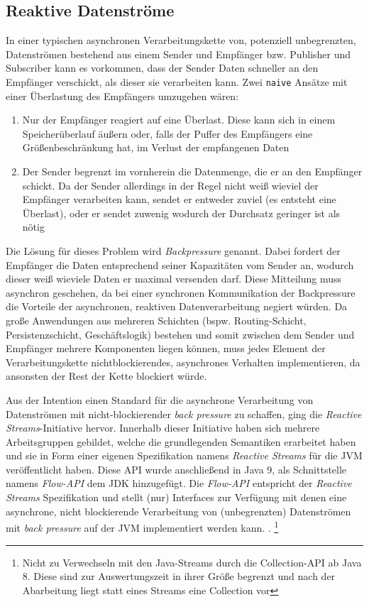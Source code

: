 \subsection{Reaktive Datenströme}
\label{section:reaktive_datenströme}
In einer typischen asynchronen Verarbeitungskette von, potenziell unbegrenzten, Datenströmen
bestehend aus einem Sender und Empfänger bzw. Publisher und Subscriber kann es vorkommen,
dass der Sender Daten schneller an den Empfänger verschickt, als dieser sie verarbeiten kann.
Zwei \verb|naive| Ansätze mit einer Überlastung des Empfängers umzugehen wären:
\begin{enumerate}
  \item Nur der Empfänger reagiert auf eine Überlast. Diese kann sich in einem Speicherüberlauf äußern oder, falls der Puffer des Empfängers eine Größenbeschränkung
        hat, im Verlust der empfangenen Daten
  \item Der Sender begrenzt im vornherein die Datenmenge, die er an den Empfänger schickt. Da der Sender allerdings in der Regel nicht weiß wieviel der Empfänger
        verarbeiten kann, sendet er entweder zuviel (es entsteht eine Überlast), oder er sendet zuwenig wodurch der Durchsatz geringer ist als nötig \parencite{JavaSpektrum2015}
\end{enumerate}
Die Lösung für dieses Problem wird \textit{Backpressure} genannt.
Dabei fordert der Empfänger die Daten entsprechend seiner Kapazitäten vom Sender an, wodurch dieser weiß wieviele Daten er maximal versenden darf.
Diese Mitteilung muss asynchron geschehen, da bei einer synchronen Kommunikation der Backpressure die Vorteile der asynchronen, reaktiven Datenverarbeitung
negiert würden.
Da große Anwendungen aus mehreren Schichten (bspw. Routing-Schicht, Persistenzschicht, Geschäftslogik) bestehen und somit zwischen
dem Sender und Empfänger mehrere Komponenten liegen können, muss jedes
Element der Verarbeitungskette nichtblockierendes, asynchrones Verhalten implementieren, da ansonsten der Rest der Kette blockiert würde.

Aus der Intention einen Standard für die asynchrone Verarbeitung von Datenströmen mit nicht-blockierender \textit{back pressure}
zu schaffen, ging die \textit{Reactive Streams}-Initiative hervor.
Innerhalb dieser Initiative haben sich mehrere Arbeitsgruppen gebildet, welche die grundlegenden Semantiken erarbeitet haben und
sie in Form einer eigenen Spezifikation namens \textit{Reactive Streams} für die JVM veröffentlicht haben.\parencite{ReactiveStreams}
Diese API wurde anschließend in Java 9, als Schnittstelle namens \textit{Flow-API} dem JDK hinzugefügt.
Die \textit{Flow-API} entspricht der \textit{Reactive Streams} Spezifikation und stellt (nur) Interfaces zur Verfügung mit denen eine
asynchrone, nicht blockierende Verarbeitung von (unbegrenzten) Datenströmen mit \textit{back pressure} auf der JVM implementiert werden kann.
\parencite{OracleFlow}.
\footnote{Nicht zu Verwechseln mit den Java-Streams durch die Collection-API ab Java 8. Diese sind zur Auswertungszeit in ihrer Größe begrenzt und
  nach der Abarbeitung liegt statt eines Streams eine Collection vor}

